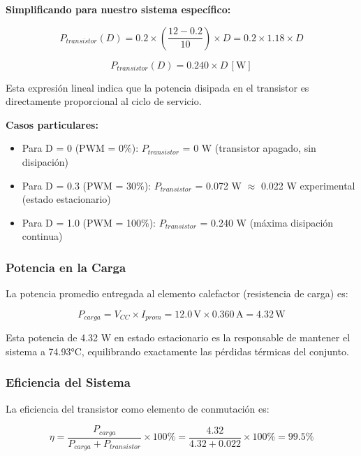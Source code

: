 \textbf{Simplificando para nuestro sistema específico:}

\begin{equation}
	P_{transistor}(D) = 0.2 \times \left(\frac{12 - 0.2}{10}\right) \times D = 0.2 \times 1.18 \times D
\end{equation}

\begin{equation}
	\boxed{P_{transistor}(D) = 0.240 \times D \,[\text{W}]}
\end{equation}

Esta expresión lineal indica que la potencia disipada en el transistor es directamente proporcional al ciclo de servicio.

\textbf{Casos particulares:}
\begin{itemize}
	\item Para D = 0 (PWM = 0\%): $P_{transistor}$ = 0 W (transistor apagado, sin disipación)
	\item Para D = 0.3 (PWM = 30\%): $P_{transistor}$ = 0.072 W $\approx$ 0.022 W experimental (estado estacionario)
	\item Para D = 1.0 (PWM = 100\%): $P_{transistor}$ = 0.240 W (máxima disipación continua)
\end{itemize}

\subsubsection{Potencia en la Carga}

La potencia promedio entregada al elemento calefactor (resistencia de carga) es:

\begin{equation}
	P_{carga} = V_{CC} \times I_{prom} = 12.0\,\text{V} \times 0.360\,\text{A} = 4.32\,\text{W}
\end{equation}

Esta potencia de 4.32 W en estado estacionario es la responsable de mantener el sistema a 74.93°C, equilibrando exactamente las pérdidas térmicas del conjunto.

\subsubsection{Eficiencia del Sistema}

La eficiencia del transistor como elemento de conmutación es:

\begin{equation}
	\eta = \frac{P_{carga}}{P_{carga} + P_{transistor}} \times 100\% = \frac{4.32}{4.32 + 0.022} \times 100\% = 99.5\%
\end{equation}

